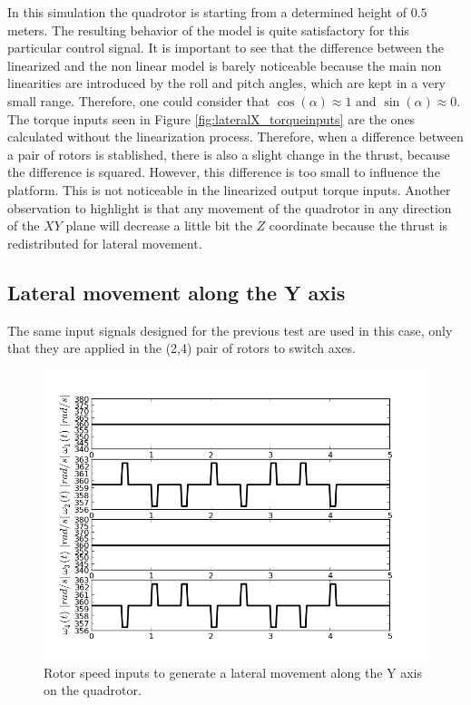 In this simulation the quadrotor is starting from a determined height of $0.5$ meters. The resulting behavior of the model is quite satisfactory for this particular control signal. It is important to see that the difference between the linearized and the non linear model is barely noticeable because the main non linearities are introduced by the roll and pitch angles, which are kept in a very small range. Therefore, one could consider that $\cos{(\alpha)} \approx 1$ and $\sin{(\alpha)} \approx 0$. The torque inputs seen in Figure \ref{fig:lateralX_torqueinputs} are the ones calculated without the linearization process. Therefore, when a difference between a pair of rotors is stablished, there is also a slight change in the thrust, because the difference is squared. However, this difference is too small to influence the platform. This is not noticeable in the linearized output torque inputs. Another observation to highlight is that any movement of the quadrotor in any direction of the $XY$ plane will decrease a little bit the $Z$ coordinate because the thrust is redistributed for lateral movement. \newpage

\subsection{Lateral movement along the Y axis}

The same input signals designed for the previous test are used in this case, only that they are applied in the (2,4) pair of rotors to switch axes.

\begin{figure}[H]
\centering
\includegraphics[scale=0.7]{Images/Chapter3/Lateral_Y/Inputs.png}
\caption{Rotor speed inputs to generate a lateral movement along the Y axis on the quadrotor.}
\label{fig:lateralY_inputs}
\end{figure}

